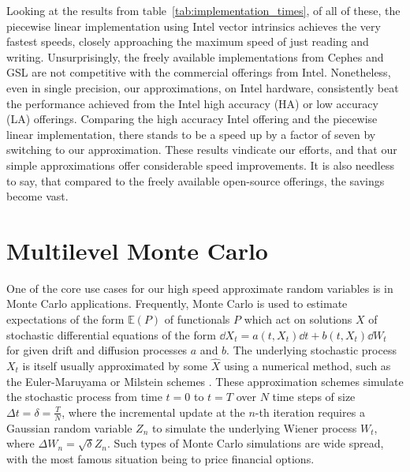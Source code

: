 \documentclass[manuscript,review]{acmart}
\begin{document}
Looking at the results from table~\ref{tab:implementation_times}, of all of these, the piecewise linear implementation using Intel vector intrinsics achieves the very fastest speeds, closely approaching the maximum speed of just reading and writing. Unsurprisingly, the freely available implementations from Cephes and GSL are not competitive with the commercial offerings from Intel. Nonetheless, even in single precision, our approximations, on Intel hardware, consistently beat the performance achieved from the Intel high accuracy (HA) or low accuracy (LA) offerings. Comparing the high accuracy Intel offering and the piecewise linear implementation, there stands to be a speed up by a factor of seven by switching to our approximation. These results vindicate our efforts, and that our simple approximations offer considerable speed improvements. It is also needless to say, that compared to the freely available open-source offerings, the savings become vast. 

\section{Multilevel Monte Carlo}
\label{sec:multilevel_monte_carlo}

One of the core use cases for our high speed approximate random variables is in Monte Carlo applications. Frequently, Monte Carlo is used to estimate expectations of the form $ \mathbb{E}(P) $ of functionals $ P $ which act on solutions $ X $ of stochastic differential equations of the form $ \dd{X_t} = a(t, X_t) \dd{t} + b(t, X_t)\dd{W_t} $ for given drift and diffusion processes $ a $ and $ b $. The underlying stochastic process $ X_t $ is itself usually approximated by some $ \hat{X} $ using a numerical method, such as the Euler-Maruyama or Milstein schemes \citep{asmussen2007stochastic,kloeden1999numerical,lord2014introduction}. These approximation schemes simulate the stochastic process from time $ t = 0 $ to $ t = T $ over $ N $ time steps of size $ \Delta t = \delta = \tfrac{T}{N} $, where the incremental update at the $ n $-th iteration requires a Gaussian random variable $ Z_n $ to simulate the underlying Wiener process $ W_t $, where $ \Delta W_n = \sqrt{\delta}Z_n $. Such types of Monte Carlo simulations are wide spread, with the most famous situation being to price financial options. 
\end{document}
